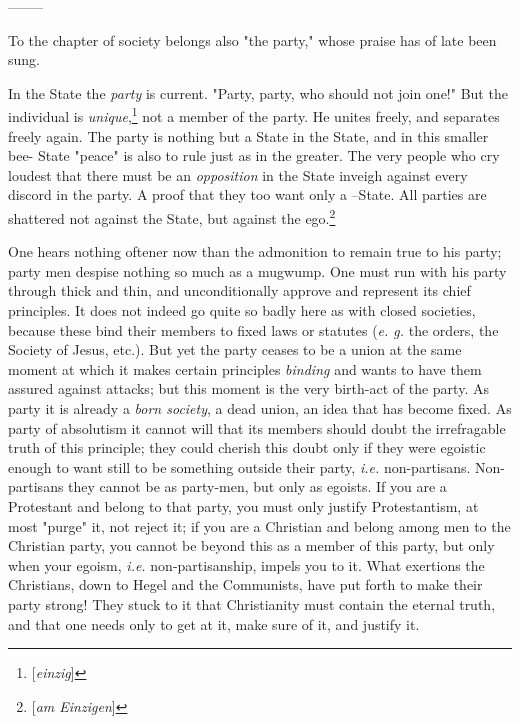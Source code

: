 \documentclass[a4paper]{book}
\begin{document}
\begin{center}
--------\end{center}


To the chapter of society belongs also "{}the party,"{} whose praise has of 
late been sung.

In the State the \textit{party} is current. "{}Party, party, who should not 
join one!"{} But the individual is 
\textit{unique},\footnote{[\textit{einzig}]} not a member of the party. He 
unites freely, and separates freely again. The party is nothing but a State in 
the State, and in this smaller bee- State "{}peace"{} is also to rule just as 
in the greater. The very people who cry loudest that there must be an 
\textit{opposition} in the State inveigh against every discord in the party. A 
proof that they too want only a --State. All parties are shattered not against 
the State, but against the ego.\footnote{[\textit{am Einzigen}]}

One hears nothing oftener now than the admonition to remain true to his party; 
party men despise nothing so much as a mugwump. One must run with his party 
through thick and thin, and unconditionally approve and represent its chief 
principles. It does not indeed go quite so badly here as with closed 
societies, because these bind their members to fixed laws or statutes 
(\textit{e. g.} the orders, the Society of Jesus, etc.). But yet the party 
ceases to be a union at the same moment at which it makes certain principles 
\textit{binding} and wants to have them assured against attacks; but this 
moment is the very birth-act of the party. As party it is already a 
\textit{born society}, a dead union, an idea that has become fixed. As party 
of absolutism it cannot will that its members should doubt the irrefragable 
truth of this principle; they could cherish this doubt only if they were 
egoistic enough to want still to be something outside their party, 
\textit{i.e.} non-partisans. Non-partisans they cannot be as party-men, but 
only as egoists. If you are a Protestant and belong to that party, you must 
only justify Protestantism, at most "{}purge"{} it, not reject it; if you are 
a Christian and belong among men to the Christian party, you cannot be beyond 
this as a member of this party, but only when your egoism, \textit{i.e.} 
non-partisanship, impels you to it. What exertions the Christians, down to 
Hegel and the Communists, have put forth to make their party strong! They 
stuck to it that Christianity must contain the eternal truth, and that one 
needs only to get at it, make sure of it, and justify it.
\end{document}
